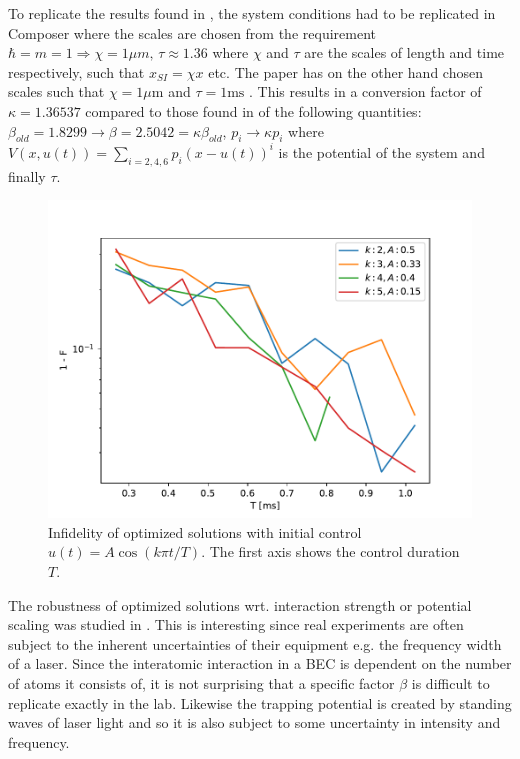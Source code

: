 \documentclass[aps,pra,reprint,superscriptaddress]{revtex4-1}
\begin{document}
To replicate the results found in \cite{QM2Paper}, the system conditions had to be replicated in Composer where the scales are chosen from the requirement $\hbar = m = 1 \Rightarrow \chi = 1\mu m, \, \tau \approx 1.36$ where $\chi$ and $\tau$ are the scales of length and time respectively, such that $x_{SI}=\chi x$ etc. The paper has on the other hand chosen scales such that $\chi = 1 \mu\text{m}$ and $\tau = 1 \text{ms}$ \cite{QEngine}. This results in a conversion factor of $\kappa = 1.36537$ compared to those found in \cite{QEngine} of the following quantities: $\beta_{old} = 1.8299 \rightarrow \beta = 2.5042 = \kappa \beta_{old}$, $p_i \rightarrow \kappa p_i$ where $V(x,u(t)) = \sum_{i=2,4,6} p_i (x-u(t))^i$ is the potential of the system and finally $\tau$. \\

\begin{figure}
	\includegraphics[width=\columnwidth]{graphics/newclustering/QM2Clustering.pdf}
	\caption{Infidelity of  optimized solutions with initial control $u(t)=A\cos(k\pi t/T)$. The first axis shows the control duration $T$.}
	\label{fig:Clustering}
\end{figure}

The robustness of optimized solutions wrt. interaction strength or potential scaling was studied in \cite{GroupPaper}. This is interesting since real experiments are often subject to the inherent uncertainties of their equipment e.g. the frequency width of a laser. Since the interatomic interaction in a BEC is dependent on the number of atoms it consists of, it is not surprising that a specific factor $\beta$ is difficult to replicate exactly in the lab. Likewise the trapping potential is created by standing waves of laser light and so it is also subject to some uncertainty in intensity and frequency.  \\
\end{document}
